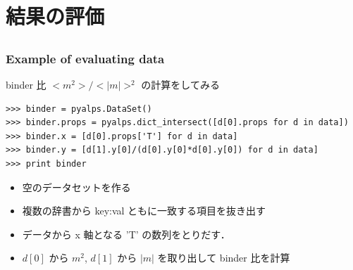 \section{結果の評価}

\subsection*{\redm\whiteb\greenb}
\begin{frame}[t,fragile]
\frametitle{Example of evaluating data}
binder 比 $<m^2>/<|m|>^2$ の計算をしてみる
\begin{lstlisting}
>>> binder = pyalps.DataSet()
>>> binder.props = pyalps.dict_intersect([d[0].props for d in data])
>>> binder.x = [d[0].props['T'] for d in data]
>>> binder.y = [d[1].y[0]/(d[0].y[0]*d[0].y[0]) for d in data]
>>> print binder
\end{lstlisting}
\begin{itemize}
\item 空のデータセットを作る
\item 複数の辞書から key:val ともに一致する項目を抜き出す
\item データから x 軸となる 'T' の数列をとりだす．
\item $d[0]$ から $m^2$, $d[1]$ から $|m|$ を取り出して binder 比を計算
\end{itemize}
\end{frame}


